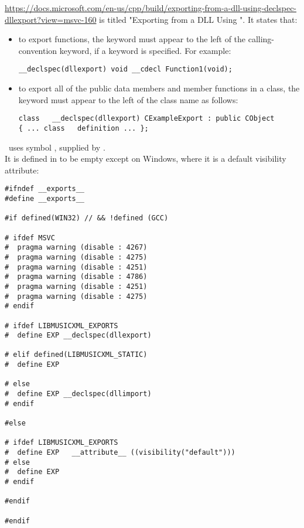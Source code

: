 \url{https://docs.microsoft.com/en-us/cpp/build/exporting-from-a-dll-using-declspec-dllexport?view=msvc-160} is titled "Exporting from a DLL Using ". It states that:
\begin{itemize}
\item to export functions, the  keyword must appear to the left of the calling-convention keyword, if a keyword is specified. For example:
\begin{lstlisting}[language=CPlusPlus]
__declspec(dllexport) void __cdecl Function1(void);
\end{lstlisting}

\item to export all of the public data members and member functions in a class, the keyword must appear to the left of the class   name as follows:
\begin{lstlisting}[language=CPlusPlus]
class   __declspec(dllexport) CExampleExport : public CObject
{ ... class   definition ... };
\end{lstlisting}

\end{itemize}

\mf\ uses symbol , supplied by \libmusicxmlSamples. \\
It is defined in  to be empty except on Windows, where it is a default visibility attribute:
\begin{lstlisting}[language=CPlusPlus]
#ifndef __exports__
#define __exports__

#if defined(WIN32) // && !defined (GCC)

# ifdef MSVC
#  pragma warning (disable : 4267)
#  pragma warning (disable : 4275)
#  pragma warning (disable : 4251)
#  pragma warning (disable : 4786)
#  pragma warning (disable : 4251)
#  pragma warning (disable : 4275)
# endif

# ifdef LIBMUSICXML_EXPORTS
#  define EXP __declspec(dllexport)

# elif defined(LIBMUSICXML_STATIC)
#  define EXP

# else
#  define EXP __declspec(dllimport)
# endif

#else

# ifdef LIBMUSICXML_EXPORTS
#  define EXP	__attribute__ ((visibility("default")))
# else
#  define EXP
# endif

#endif

#endif
\end{lstlisting}


